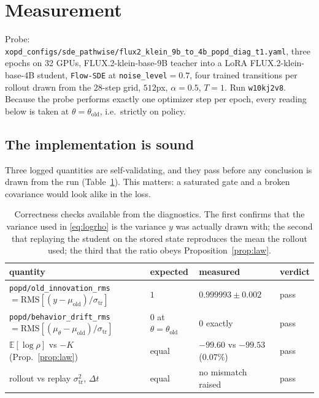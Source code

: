 \documentclass[11pt,a4paper]{article}
\newcommand{\E}{\mathbb{E}}
\newcommand{\dt}{\Delta t}
\newcommand{\str}{\sigma_{\mathrm{tr}}}
\newcommand{\muold}{\mu_{\mathrm{old}}}
\newcommand{\mus}{\mu_{\theta}}
\begin{document}
\section{Measurement}
\label{sec:measurement}

Probe: \texttt{xopd\_configs/sde\_pathwise/flux2\_klein\_9b\_to\_4b\_popd\_diag\_t1.yaml}, three
epochs on 32 GPUs, FLUX.2-klein-base-9B teacher into a LoRA FLUX.2-klein-base-4B student,
\texttt{Flow-SDE} at \texttt{noise\_level}$=0.7$, four trained transitions per rollout drawn from
the 28-step grid, $512$px, $\alpha=0.5$, $T=1$. Run \texttt{w10kj2v8}. Because the probe performs
exactly one optimizer step per epoch, every reading below is taken at
$\theta=\theta_{\mathrm{old}}$, i.e.\ strictly on policy.

\subsection{The implementation is sound}
\label{ssec:checks}

Three logged quantities are self-validating, and they pass before any conclusion is drawn from
the run (Table~\ref{tab:checks}). This matters: a saturated gate and a broken covariance would
look alike in the loss.

\begin{table}[htbp]
\centering
\caption{Correctness checks available from the diagnostics. The first confirms that the variance
used in \eqref{eq:logrho} is the variance $y$ was actually drawn with; the second that replaying
the student on the stored state reproduces the mean the rollout used; the third that the ratio
obeys Proposition~\ref{prop:law}.}
\label{tab:checks}
\begin{tabular}{@{}llll@{}}
\toprule
quantity & expected & measured & verdict\\
\midrule
\texttt{popd/old\_innovation\_rms} $=\mathrm{RMS}[(y-\muold)/\str]$
  & $1$ & $0.999993\pm0.002$ & pass\\
\texttt{popd/behavior\_drift\_rms} $=\mathrm{RMS}[(\mus-\muold)/\str]$
  & $0$ at $\theta=\theta_{\mathrm{old}}$ & $0$ exactly & pass\\
$\E[\log\rho]$ vs $-K$ (Prop.~\ref{prop:law})
  & equal & $-99.60$ vs $-99.53$ ($0.07\%$) & pass\\
rollout vs replay $\str^2$, $\dt$
  & equal & no mismatch raised & pass\\
\bottomrule
\end{tabular}
\end{table}
\end{document}
